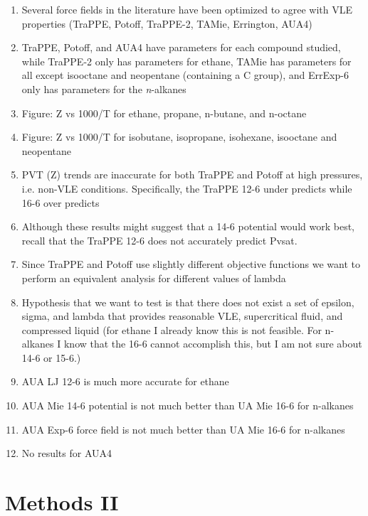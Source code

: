 \documentclass[journal=jctc,manuscript=article]{achemso}
\begin{document}
\begin{enumerate}
	\item Several force fields in the literature have been optimized to agree with VLE properties (TraPPE, Potoff, TraPPE-2, TAMie, Errington, AUA4)
	\item TraPPE, Potoff, and AUA4 have parameters for each compound studied, while TraPPE-2 only has parameters for ethane, TAMie has parameters for all except isooctane and neopentane (containing a C group), and ErrExp-6 only has parameters for the \textit{n}-alkanes
	\item Figure: Z vs 1000/T for ethane, propane, n-butane, and n-octane
	\item Figure: Z vs 1000/T for isobutane, isopropane, isohexane, isooctane and neopentane 
	\item PVT (Z) trends are inaccurate for both TraPPE and Potoff at high pressures, i.e. non-VLE conditions. Specifically, the TraPPE 12-6 under predicts while 16-6 over predicts
	\item Although these results might suggest that a 14-6 potential would work best, recall that the TraPPE 12-6 does not accurately predict Pvsat. 
	\item Since TraPPE and Potoff use slightly different objective functions we want to perform an equivalent analysis for different values of lambda
	\item Hypothesis that we want to test is that there does not exist a set of epsilon, sigma, and lambda that provides reasonable VLE, supercritical fluid, and compressed liquid (for ethane I already know this is not feasible. For n-alkanes I know that the 16-6 cannot accomplish this, but I am not sure about 14-6 or 15-6.)
	\item AUA LJ 12-6 is much more accurate for ethane
	\item AUA Mie 14-6 potential is not much better than UA Mie 16-6 for n-alkanes
	\item AUA Exp-6 force field is not much better than UA Mie 16-6 for n-alkanes
	\item No results for AUA4
\end{enumerate}

\section{Methods II} \label{Methods II}
\end{document}
